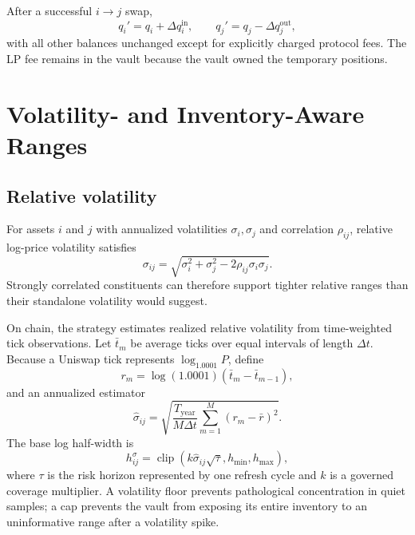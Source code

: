 \documentclass[11pt]{article}
\begin{document}
After a successful $i\rightarrow j$ swap,
\begin{equation}
  q_i'=q_i+\Delta q_i^{\mathrm{in}},\qquad
  q_j'=q_j-\Delta q_j^{\mathrm{out}},
  \label{eq:vaulttransition}
\end{equation}
with all other balances unchanged except for explicitly charged protocol fees.
The LP fee remains in the vault because the vault owned the temporary
positions.

\section{Volatility- and Inventory-Aware Ranges}
\label{sec:ranges}

\subsection{Relative volatility}

For assets $i$ and $j$ with annualized volatilities $\sigma_i,\sigma_j$ and
correlation $\rho_{ij}$, relative log-price volatility satisfies
\begin{equation}
  \sigma_{ij}=\sqrt{\sigma_i^2+\sigma_j^2-2\rho_{ij}\sigma_i\sigma_j}.
  \label{eq:relativevol}
\end{equation}
Strongly correlated constituents can therefore support tighter relative ranges
than their standalone volatility would suggest.

On chain, the strategy estimates realized relative volatility from time-weighted
tick observations. Let $\bar{t}_m$ be average ticks over equal intervals of
length $\Delta t$. Because a Uniswap tick represents $\log_{1.0001}P$, define
\begin{equation}
  r_m=\log(1.0001)(\bar{t}_m-\bar{t}_{m-1}),
\end{equation}
and an annualized estimator
\begin{equation}
  \widehat{\sigma}_{ij}=
  \sqrt{\frac{T_{\mathrm{year}}}{M\Delta t}
  \sum_{m=1}^{M}(r_m-\bar r)^2}.
  \label{eq:realizedvol}
\end{equation}
The base log half-width is
\begin{equation}
  h_{ij}^{\sigma}=\operatorname{clip}
  \left(k\widehat{\sigma}_{ij}\sqrt{\tau},h_{\min},h_{\max}\right),
  \label{eq:volwidth}
\end{equation}
where $\tau$ is the risk horizon represented by one refresh cycle and $k$ is a
governed coverage multiplier. A volatility floor prevents pathological
concentration in quiet samples; a cap prevents the vault from exposing its
entire inventory to an uninformative range after a volatility spike.
\end{document}
